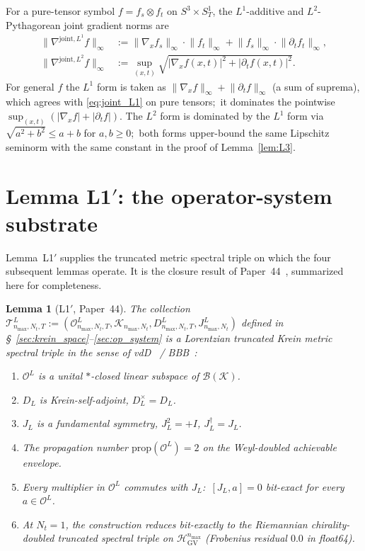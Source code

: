 \documentclass[11pt,a4paper]{article}
\theoremstyle{plain}
\newtheorem{lemma}[theorem]{Lemma}
\theoremstyle{definition}
\newcommand{\nmax}{n_{\max}}
\newcommand{\Nt}{N_{t}}
\newcommand{\Manifold}{S^{3}\times S^{1}_{T}}
\newcommand{\Krein}{\mathcal{K}}
\newcommand{\Op}{\mathcal{O}}
\newcommand{\Tcal}{\mathcal{T}}
\newcommand{\Bcal}{\mathcal{B}}
\newcommand{\norm}[1]{\lVert #1 \rVert}
\newcommand{\DL}{D_{L}}
\newcommand{\JL}{J_{L}}
\newcommand{\HGV}{\mathcal{H}_{\mathrm{GV}}}
\newcommand{\prop}{\mathrm{prop}}
\begin{document}
For a pure-tensor symbol $f = f_{s} \otimes f_{t}$ on $\Manifold$,
the $L^{1}$-additive and $L^{2}$-Pythagorean joint gradient norms are
\begin{align}
   \norm{\nabla^{\mathrm{joint}, L^{1}} f}_{\infty}
   &:= \norm{\nabla_{x} f_{s}}_{\infty} \cdot \norm{f_{t}}_{\infty}
     + \norm{f_{s}}_{\infty} \cdot \norm{\partial_{t} f_{t}}_{\infty},
   \label{eq:joint_L1} \\
   \norm{\nabla^{\mathrm{joint}, L^{2}} f}_{\infty}
   &:= \sup_{(x, t)} \sqrt{
        |\nabla_{x} f(x, t)|^{2} + |\partial_{t} f(x, t)|^{2}}.
   \label{eq:joint_L2}
\end{align}
For general $f$ the $L^{1}$ form is taken as
$\norm{\nabla_{x} f}_{\infty} + \norm{\partial_{t} f}_{\infty}$ (a sum of
suprema), which agrees with \eqref{eq:joint_L1} on pure tensors;\ it
dominates the pointwise $\sup_{(x,t)}(|\nabla_x f| + |\partial_t f|)$.
The $L^{2}$ form is dominated by the $L^{1}$ form via
$\sqrt{a^{2} + b^{2}} \le a + b$ for $a, b \ge 0$;\ both forms
upper-bound the same Lipschitz seminorm with the same constant in the
proof of Lemma~\ref{lem:L3}.

\section{Lemma L1$'$: the operator-system substrate}\label{sec:L1prime}

Lemma~L1$'$ supplies the truncated metric spectral triple on which
the four subsequent lemmas operate. It is the closure result of
Paper~44~\cite{paper44}, summarized here for completeness.

\begin{lemma}[L1$'$, Paper~44]\label{lem:L1prime}
The collection
$\Tcal^{L}_{\nmax,\Nt,T} := (\Op^{L}_{\nmax,\Nt,T},
\Krein_{\nmax,\Nt}, D^{L}_{\nmax,\Nt,T}, J^{L}_{\nmax,\Nt})$ defined in
\S~\ref{sec:krein_space}--\ref{sec:op_system} is a Lorentzian
truncated Krein metric spectral triple in the sense of
vdD~\cite{vandungen2016} / BBB~\cite{bizi_brouder_besnard2018}:
\begin{enumerate}
\item[(a)] $\Op^{L}$ is a unital $\ast$-closed linear subspace of
$\Bcal(\Krein)$.
\item[(b)] $\DL$ is Krein-self-adjoint, $\DL^{\times} = \DL$.
\item[(c)] $\JL$ is a fundamental symmetry, $\JL^{2} = +I$,
$\JL^{\dagger} = \JL$.
\item[(d)] The propagation number $\prop(\Op^{L}) = 2$ on the
Weyl-doubled achievable envelope.
\item[(e)] Every multiplier in $\Op^{L}$ commutes with $\JL$:\
$[\JL, a] = 0$ bit-exact for every $a \in \Op^{L}$.
\item[(f)] At $\Nt = 1$, the construction reduces bit-exactly to the
Riemannian chirality-doubled truncated spectral triple on
$\HGV^{\nmax}$ (Frobenius residual $0.0$ in float64).
\end{enumerate}
\end{lemma}
\end{document}

